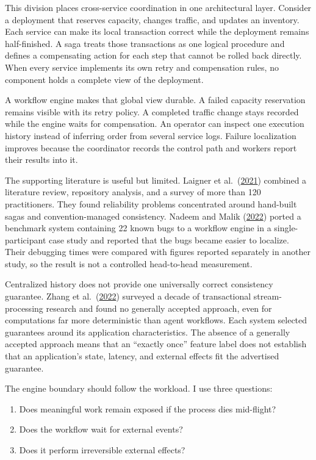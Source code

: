 This division places cross-service coordination in one architectural layer. Consider a deployment that reserves capacity, changes traffic, and updates an inventory. Each service can make its local transaction correct while the deployment remains half-finished. A saga treats those transactions as one logical procedure and defines a compensating action for each step that cannot be rolled back directly. When every service implements its own retry and compensation rules, no component holds a complete view of the deployment.

A workflow engine makes that global view durable. A failed capacity reservation remains visible with its retry policy. A completed traffic change stays recorded while the engine waits for compensation. An operator can inspect one execution history instead of inferring order from several service logs. Failure localization improves because the coordinator records the control path and workers report their results into it.

The supporting literature is useful but limited. Laigner et al.~(\href{https://arxiv.org/abs/2103.00170}{2021}) combined a literature review, repository analysis, and a survey of more than 120 practitioners. They found reliability problems concentrated around hand-built sagas and convention-managed consistency. Nadeem and Malik (\href{https://arxiv.org/abs/2204.07210}{2022}) ported a benchmark system containing 22 known bugs to a workflow engine in a single-participant case study and reported that the bugs became easier to localize. Their debugging times were compared with figures reported separately in another study, so the result is not a controlled head-to-head measurement.

Centralized history does not provide one universally correct consistency guarantee. Zhang et al.~(\href{https://arxiv.org/abs/2208.09827}{2022}) surveyed a decade of transactional stream-processing research and found no generally accepted approach, even for computations far more deterministic than agent workflows. Each system selected guarantees around its application characteristics. The absence of a generally accepted approach means that an ``exactly once'' feature label does not establish that an application's state, latency, and external effects fit the advertised guarantee.

The engine boundary should follow the workload. I use three questions:

\begin{enumerate}
\def\labelenumi{\arabic{enumi}.}
\tightlist
\item
  Does meaningful work remain exposed if the process dies mid-flight?
\item
  Does the workflow wait for external events?
\item
  Does it perform irreversible external effects?
\end{enumerate}


